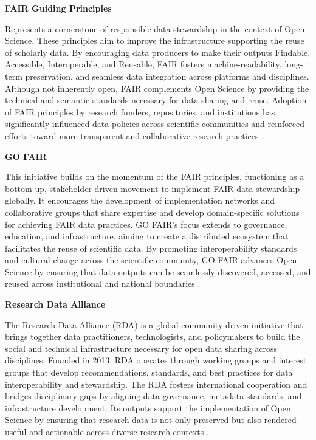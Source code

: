 \documentclass[final]{rc-book-2.14}
\begin{document}
\textbf{FAIR Guiding Principles}

Represents a cornerstone of responsible data stewardship in the context of Open Science. These principles aim to improve the infrastructure supporting the reuse of scholarly data. By encouraging data producers to make their outputs Findable, Accessible, Interoperable, and Reusable, FAIR fosters machine-readability, long-term preservation, and seamless data integration across platforms and disciplines. Although not inherently open, FAIR complements Open Science by providing the technical and semantic standards necessary for data sharing and reuse. Adoption of FAIR principles by research funders, repositories, and institutions has significantly influenced data policies across scientific communities and reinforced efforts toward more transparent and collaborative research practices \cite{wilkinson_fair_2016}.


\textbf{GO FAIR}

This initiative builds on the momentum of the FAIR principles, functioning as a bottom-up, stakeholder-driven movement to implement FAIR data stewardship globally. It encourages the development of implementation networks and collaborative groups that share expertise and develop domain-specific solutions for achieving FAIR data practices. GO FAIR’s focus extends to governance, education, and infrastructure, aiming to create a distributed ecosystem that facilitates the reuse of scientific data. By promoting interoperability standards and cultural change across the scientific community, GO FAIR advances Open Science by ensuring that data outputs can be seamlessly discovered, accessed, and reused across institutional and national boundaries \cite{henning_go_2019}.


\textbf{Research Data Alliance}

The Research Data Alliance (RDA) is a global community-driven initiative that brings together data practitioners, technologists, and policymakers to build the social and technical infrastructure necessary for open data sharing across disciplines. Founded in 2013, RDA operates through working groups and interest groups that develop recommendations, standards, and best practices for data interoperability and stewardship. The RDA fosters international cooperation and bridges disciplinary gaps by aligning data governance, metadata standards, and infrastructure development. Its outputs support the implementation of Open Science by ensuring that research data is not only preserved but also rendered useful and actionable across diverse research contexts \cite{berman_research_2020}.
\end{document}

